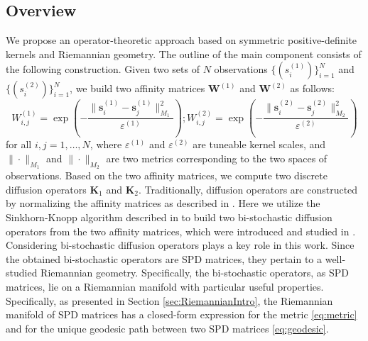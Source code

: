 \documentclass[]{article}
\theoremstyle{definition}
\begin{document}
\subsection{Overview}
We propose an operator-theoretic approach based on symmetric positive-definite kernels and Riemannian geometry.
The outline of the main component consists of the following construction.
%
Given two sets of $N$ observations $\{(s^{(1)}_i)\}_{i=1}^N$ and $\{(s^{(2)}_i)\}_{i=1}^N$, we build two affinity matrices $\mathbf{W}^{(1)}$ and $\mathbf{W}^{(2)}$ as follows:
	\begin{equation}
	\label{eq:AffinityMatrices}
	W_{i,j}^{(1)}=\exp\left(-\frac{\|\boldsymbol{s}^{(1)}_i-\boldsymbol{s}^{(1)}_j\|_{M_1}^2}{\varepsilon^{(1)}}\right) ; W_{i,j}^{(2)}=\exp\left(-\frac{\|\boldsymbol{s}^{(2)}_i-\boldsymbol{s}^{(2)}_j\|_{M_2}^2}{\varepsilon^{(2)}}\right)
	\end{equation}
	for all $i,j=1,\hdots,N$, where $\varepsilon^{(1)}$ and $\varepsilon^{(2)}$ are tuneable kernel scales, and $\|\cdot\|_{M_1}$ and $\|\cdot\|_{M_2}$ are two metrics corresponding to the two spaces of observations.
Based on the two affinity matrices, we compute two discrete diffusion operators $\mathbf{K}_1$ and $\mathbf{K}_2$.
Traditionally, diffusion operators are constructed by normalizing the affinity matrices as described in \cite{coifman2006diffusion}. Here we utilize the Sinkhorn-Knopp algorithm described in \cite{knight2008sinkhorn} to build two bi-stochastic diffusion operators from the two affinity matrices, which were introduced and studied in \cite{coifman2017manifold}.
%
Considering bi-stochastic diffusion operators plays a key role in this work.
Since the obtained bi-stochastic operators are \gls{SPD} matrices, they pertain to a well-studied Riemannian geometry. Specifically, the bi-stochastic operators, as SPD matrices, lie on a Riemannian manifold with particular useful properties. Specifically, as presented in Section \ref{sec:RiemannianIntro}, the Riemannian manifold of SPD matrices has a closed-form expression for the metric \eqref{eq:metric} and for the unique geodesic path between two SPD matrices \eqref{eq:geodesic}.
	
\end{document}
